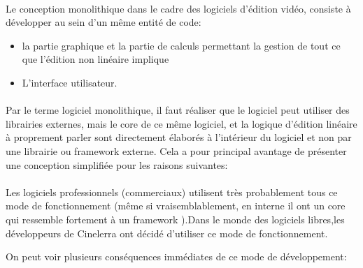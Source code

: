 \paragraph{}

Le conception monolithique  dans le cadre des
logiciels d'édition vidéo, consiste à développer au sein d'un même
entité de code:

\begin{itemize} \setlength{\itemsep}{2mm}

  \item {la partie graphique et la partie de calculs
    permettant la gestion de tout ce que l'édition non linéaire
    implique}

  \item {L'interface utilisateur.}

\end {itemize}

\paragraph{}

Par le terme logiciel monolithique, il faut réaliser
que le logiciel peut utiliser des librairies externes, mais le core
de ce même logiciel, et la logique d'édition linéaire à proprement
parler sont directement élaborés à l'intérieur du logiciel et non
par une librairie ou framework  externe. Cela a pour
principal avantage de présenter une conception simplifiée pour les
raisons suivantes:

\paragraph{}

Les logiciels professionnels (commerciaux) utilisent très probablement
tous ce mode de fonctionnement (même si vraisemblablement,
en interne il ont un core qui ressemble fortement à un framework
).Dans le monde des logiciels libres,les développeurs
de Cinelerra ont décidé d'utiliser ce mode de fonctionnement.

On peut voir plusieurs conséquences immédiates de ce mode de
développement:

